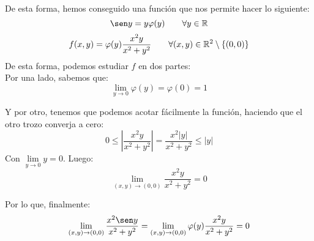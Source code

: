 De esta forma, hemos conseguido una función que nos permite hacer lo siguiente:
$$\sen y = y\varphi(y)~~~~~~\forall y \in \R$$
$$f(x,y)=\varphi(y)\dfrac{x^2y}{x^2+y^2}~~~~~~\forall (x,y) \in \mathbb R^2\setminus\{(0,0)\}$$
De esta forma, podemos estudiar $f$ en dos partes:\\


Por una lado, sabemos que:
$$\lim_{y \to 0} \varphi(y) = \varphi(0) = 1$$


Y por otro, tenemos que podemos acotar fácilmente la función, haciendo que el otro trozo converja a cero:
$$0 \leq \left| \dfrac{x^2y}{x^2+y^2} \right| = \dfrac{x^2|y|}{x^2+y^2} \leq |y|$$
Con $\lim\limits_{y \to 0}y = 0$. Luego:
$$\lim_{(x,y) \to (0,0)} \dfrac{x^2y}{x^2+y^2}=0$$


Por lo que, finalmente:
$$\lim_{(x,y) \to (0,0)} \dfrac{x^2\sen y}{x^2+y^2} = \lim_{(x,y) \to (0,0)} \varphi(y)\dfrac{x^2y}{x^2+y^2}=0$$